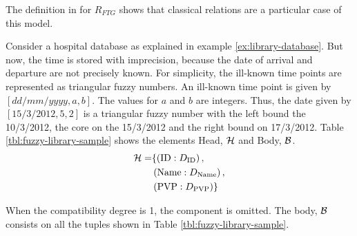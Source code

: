 The definition in \cite{Medina1994} for $R_{FTG}$ shows that classical relations are a particular case of this model. 

\begin{example}
\label{ex:sample-ft-database}
 Consider a hospital database as explained in example \ref{ex:library-database}. But now, the time is stored with imprecision, because the date of arrival and departure are not precisely known. For simplicity, the ill-known time points are represented as triangular fuzzy numbers. An ill-known time point is given by $[dd/mm/yyyy,a,b]$. The values for $a$ and $b$ are integers. Thus, the date given by $[15/3/2012,5,2]$ is a triangular fuzzy number with the left bound the 10/3/2012, the core on the 15/3/2012 and the right bound on 17/3/2012.
Table \ref{tbl:fuzzy-library-sample} shows the elements Head, $\mathcal{H}$ and Body, $\mathcal{B}$. 
\begin{align}
 \label{eq:head-ex}
\mathcal{H} = & \lbrace \left(\text{ID}:D_{\text{ID}}\right),\\
\nonumber
&  \left(\text{Name}:D_{\text{Name}}\right),\\
\nonumber
& \left(\text{PVP}:D_{\text{PVP}}\right) \rbrace
\end{align}

When the compatibility degree is 1, the component is omitted. The body, $\mathcal{B}$ consists on all the tuples shown in Table \ref{tbl:fuzzy-library-sample}. 

\end{example}



